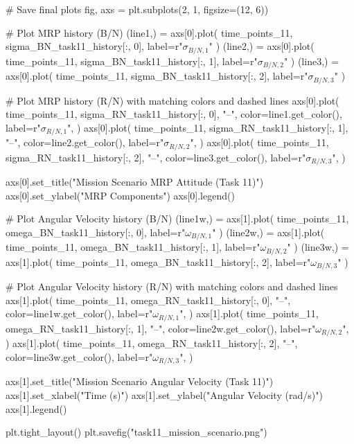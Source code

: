 \documentclass[conf]{new-aiaa}
\begin{document}
\begin{pythoncode}
# Save final plots
fig, axs = plt.subplots(2, 1, figsize=(12, 6))

# Plot MRP history (B/N)
(line1,) = axs[0].plot(
    time_points_11, sigma_BN_task11_history[:, 0], label=r"$\sigma_{B/N,1}$"
)
(line2,) = axs[0].plot(
    time_points_11, sigma_BN_task11_history[:, 1], label=r"$\sigma_{B/N,2}$"
)
(line3,) = axs[0].plot(
    time_points_11, sigma_BN_task11_history[:, 2], label=r"$\sigma_{B/N,3}$"
)

# Plot MRP history (R/N) with matching colors and dashed lines
axs[0].plot(
    time_points_11,
    sigma_RN_task11_history[:, 0],
    "--",
    color=line1.get_color(),
    label=r"$\sigma_{R/N,1}$",
)
axs[0].plot(
    time_points_11,
    sigma_RN_task11_history[:, 1],
    "--",
    color=line2.get_color(),
    label=r"$\sigma_{R/N,2}$",
)
axs[0].plot(
    time_points_11,
    sigma_RN_task11_history[:, 2],
    "--",
    color=line3.get_color(),
    label=r"$\sigma_{R/N,3}$",
)

axs[0].set_title("Mission Scenario MRP Attitude (Task 11)")
axs[0].set_ylabel("MRP Components")
axs[0].legend()

# Plot Angular Velocity history (B/N)
(line1w,) = axs[1].plot(
    time_points_11, omega_BN_task11_history[:, 0], label=r"$\omega_{B/N,1}$"
)
(line2w,) = axs[1].plot(
    time_points_11, omega_BN_task11_history[:, 1], label=r"$\omega_{B/N,2}$"
)
(line3w,) = axs[1].plot(
    time_points_11, omega_BN_task11_history[:, 2], label=r"$\omega_{B/N,3}$"
)

# Plot Angular Velocity history (R/N) with matching colors and dashed lines
axs[1].plot(
    time_points_11,
    omega_RN_task11_history[:, 0],
    "--",
    color=line1w.get_color(),
    label=r"$\omega_{R/N,1}$",
)
axs[1].plot(
    time_points_11,
    omega_RN_task11_history[:, 1],
    "--",
    color=line2w.get_color(),
    label=r"$\omega_{R/N,2}$",
)
axs[1].plot(
    time_points_11,
    omega_RN_task11_history[:, 2],
    "--",
    color=line3w.get_color(),
    label=r"$\omega_{R/N,3}$",
)

axs[1].set_title("Mission Scenario Angular Velocity (Task 11)")
axs[1].set_xlabel("Time (s)")
axs[1].set_ylabel("Angular Velocity (rad/s)")
axs[1].legend()

plt.tight_layout()
plt.savefig("task11_mission_scenario.png")

\end{pythoncode}



\end{document}
